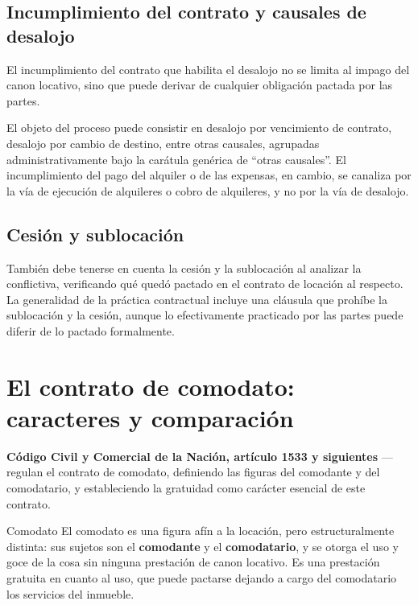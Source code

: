 \documentclass[12pt,oneside]{book}
\begin{document}
\subsection{Incumplimiento del contrato y causales de desalojo}

El incumplimiento del contrato que habilita el desalojo no se limita al impago del canon locativo, sino que puede derivar de cualquier obligación pactada por las partes.

\begin{note}
El objeto del proceso puede consistir en desalojo por vencimiento de contrato, desalojo por cambio de destino, entre otras causales, agrupadas administrativamente bajo la carátula genérica de ``otras causales''. El incumplimiento del pago del alquiler o de las expensas, en cambio, se canaliza por la vía de ejecución de alquileres o cobro de alquileres, y no por la vía de desalojo.
\end{note}

\subsection{Cesión y sublocación}

También debe tenerse en cuenta la cesión y la sublocación al analizar la conflictiva, verificando qué quedó pactado en el contrato de locación al respecto. La generalidad de la práctica contractual incluye una cláusula que prohíbe la sublocación y la cesión, aunque lo efectivamente practicado por las partes puede diferir de lo pactado formalmente.

\section{El contrato de comodato: caracteres y comparación}

\begin{normacitada}
\textbf{Código Civil y Comercial de la Nación, artículo 1533 y siguientes} --- regulan el contrato de comodato, definiendo las figuras del comodante y del comodatario, y estableciendo la gratuidad como carácter esencial de este contrato.
\end{normacitada}

\begin{definition}{Comodato}
El comodato es una figura afín a la locación, pero estructuralmente distinta: sus sujetos son el \textbf{comodante} y el \textbf{comodatario}, y se otorga el uso y goce de la cosa sin ninguna prestación de canon locativo. Es una prestación gratuita en cuanto al uso, que puede pactarse dejando a cargo del comodatario los servicios del inmueble.
\end{definition}
\end{document}
